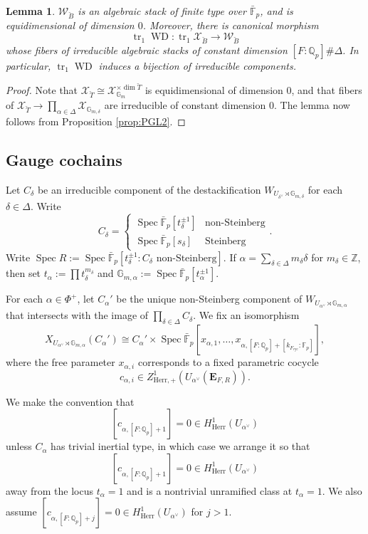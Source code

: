 \documentclass[11pt]{amsart}
\newcommand{\MINOREDITED}[1]{#1}
\newtheorem{lem}[thm]{Lemma}
\theoremstyle{definition}
\newcommand{\Z}{\mathbb{Z}}
\newcommand{\Q}{\mathbb{Q}}
\newcommand{\G}{\mathbb{G}}
\newcommand{\F}{\mathbb{F}}
\newcommand{\bfE}{\mathbf{E}}
\newcommand{\bFp}{\bar{\mathbb{F}}_p}
\newcommand{\cX}{\mathcal{X}}
\newcommand{\cW}{\mathcal{W}}
\newcommand{\bB}{\breve{B}}
\newcommand{\bT}{\breve{T}}
\newcommand{\cyc}{{\operatorname{cyc}}}
\newcommand{\dkF}{[k_{F_{\cyc}}:\F_p]}
\newcommand{\dF}{[F:\Q_p]}
\DeclareMathOperator{\tr}{tr}
\DeclareMathOperator{\WD}{WD}
\DeclareMathOperator{\Spec}{Spec}
\newcommand{\Herr}{\mathrm{Herr}}
\begin{document}
\begin{lem}
$\cW_{\bB}$
is an algebraic stack of finite type over $\bFp$,
and is equidimensional of dimension $0$.
Moreover,
there is canonical morphism
\[
\tr_1\WD:
\tr_1\cX_{\bB}\to \cW_{\bB}
\]
whose fibers of irreducible algebraic stacks of 
constant dimension $\dF\#\Delta$.
In particular,
$\tr_1\WD$
induces a bijection of irreducible components.
\end{lem}

\begin{proof}
Note that $\cX_{\bT}\cong \cX_{\G_m}^{\times \dim \bT}$ is equidimensional of dimension $0$,
and that fibers of $\cX_{\bT}\to \prod_{\alpha\in \Delta} 
\cX_{\G_{m,\delta}}$
are irreducible of constant dimension $0$.
The lemma now follows from Proposition \ref{prop:PGL2}.
\end{proof}


\subsection{Gauge cochains}

Let $C_{\delta}$ be an irreducible
component
of the \MINOREDITED{destackification} $W_{U_{\delta^\vee}\rtimes \G_{m,\delta}}$
for each $\delta\in \Delta$.
Write
\[
C_{\delta}=
\begin{cases}
\Spec \bFp[t_\delta^{\pm1}]
&\text{non-Steinberg}
\\
\Spec \bFp[s_\delta]
&\text{Steinberg}
\end{cases}.
\]
Write
$\Spec R:=\Spec \bFp[t_\delta^{\pm1}:C_\delta\text{~non-Steinberg}]$.
If $\alpha=\sum_{\delta\in \Delta} m_\delta \delta$
for $m_\delta\in \Z$,
then set
$t_\alpha:=\prod t_{\delta}^{m_\delta}$
and $\G_{m,\alpha}:=\Spec \bFp[t_\alpha^{\pm1}]$.

For each $\alpha\in \Phi^+$,
let
$C_\alpha'$
be the unique non-Steinberg component
of $W_{U_{\alpha^\vee}\rtimes \G_{m, \alpha}}$
that intersects with the image
of $\prod_{\delta\in \Delta}C_\delta$.
We fix an isomorphism
\[
X_{U_{\alpha^\vee}\rtimes \G_{m, \alpha}}(C_\alpha')
\cong C_\alpha'\times \Spec
\bFp[x_{\alpha, 1}, \dots, x_{\alpha, \dF+\dkF}],
\]
where the free parameter
$x_{\alpha, i}$
corresponds to a fixed parametric cocycle
\[
c_{\alpha, i}\in Z^1_{\Herr,+}(U_{\alpha^\vee}(\bfE_{F, R})).
\]

We make the convention that
\[
[c_{\alpha,\dF+1}] =0 \in H^1_{\Herr}(U_{\alpha^\vee})
\]
unless
$C_\alpha$ has trivial inertial type,
in which case we arrange it so that
\begin{equation}
\label{eq:clast}
[c_{\alpha,\dF+1}] =0 \in H^1_{\Herr}(U_{\alpha^\vee})
\end{equation}
 away from the locus $t_\alpha=1$
and is a nontrivial unramified class at $t_\alpha=1$.
We also assume
$[c_{\alpha, \dF+j}]=0\in H^1_{\Herr}(U_{\alpha^\vee})$
for $j>1$.
\end{document}

